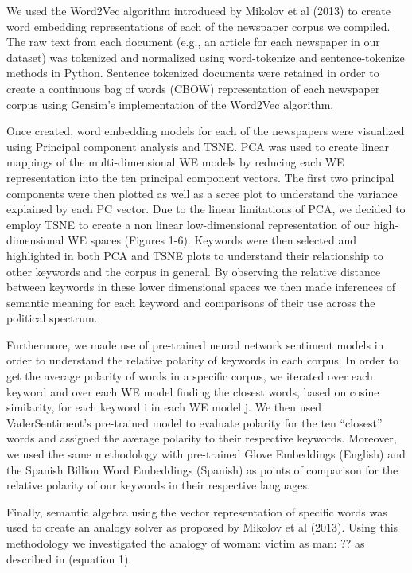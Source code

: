 \documentclass{article}
\begin{document}
{{We used the Word2Vec algorithm introduced by Mikolov et al (2013) to create word embedding representations of each of the newspaper corpus we compiled. The raw text from each document (e.g., an article for each newspaper in our dataset) was tokenized
and normalized using word-tokenize and sentence-tokenize methods in Python. Sentence tokenized documents were retained in order to create a continuous bag of words (CBOW) representation of each newspaper corpus using Gensim’s implementation of the Word2Vec algorithm.

Once created, word embedding models for each of the newspapers were visualized using Principal component analysis and TSNE. PCA was used to create linear mappings of the multi-dimensional WE models by reducing each WE representation into the ten principal component vectors. The first two principal components were then plotted as well as a scree plot to understand the variance explained by each PC vector. Due to the linear limitations of PCA, we decided to employ TSNE to create a non linear low-dimensional representation of our high-dimensional WE spaces (Figures 1-6). Keywords were then selected and highlighted in both PCA and TSNE plots to understand their relationship to other keywords and the corpus in general. By observing the relative distance between keywords in these lower dimensional spaces we then made inferences of semantic meaning for each keyword and comparisons of their use across the political spectrum.

Furthermore, we made use of pre-trained neural network sentiment models in order to understand the relative polarity of keywords in each corpus. In order to get the average polarity of words in a specific corpus, we iterated over each keyword and over each WE model finding the closest words,  based on cosine similarity, for each keyword i in each WE model j. We then used VaderSentiment’s pre-trained model to evaluate polarity for the ten “closest” words and assigned the average polarity to their respective keywords. Moreover, we used the same methodology with pre-trained Glove Embeddings (English) and the Spanish Billion Word Embeddings (Spanish) as points of comparison for the relative polarity of our keywords in their respective languages. 

Finally, semantic algebra using the vector representation of specific words was used to create an analogy solver as proposed by Mikolov et al (2013). Using this methodology we investigated the analogy of woman: victim as man: ?? as described in (equation 1). 

}}
\end{document}
